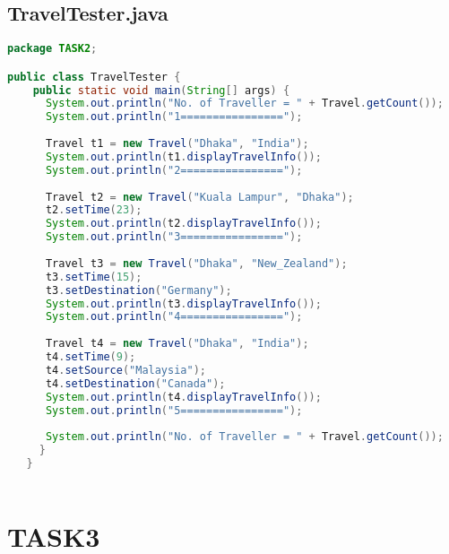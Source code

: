 \documentclass[11pt,a4paper]{article}
\begin{document}
\subsection*{TravelTester.java}
\begin{lstlisting}[style=codestyle,language=Java]
package TASK2;

public class TravelTester {
    public static void main(String[] args) {
      System.out.println("No. of Traveller = " + Travel.getCount());
      System.out.println("1================");
        
      Travel t1 = new Travel("Dhaka", "India");
      System.out.println(t1.displayTravelInfo());
      System.out.println("2================");
   
      Travel t2 = new Travel("Kuala Lampur", "Dhaka");
      t2.setTime(23);
      System.out.println(t2.displayTravelInfo());
      System.out.println("3================");
   
      Travel t3 = new Travel("Dhaka", "New_Zealand");
      t3.setTime(15);
      t3.setDestination("Germany");
      System.out.println(t3.displayTravelInfo());
      System.out.println("4================");
   
      Travel t4 = new Travel("Dhaka", "India");
      t4.setTime(9);
      t4.setSource("Malaysia");
      t4.setDestination("Canada");
      System.out.println(t4.displayTravelInfo());
      System.out.println("5================");
   
      System.out.println("No. of Traveller = " + Travel.getCount());
     }
   }
   
\end{lstlisting}

\clearpage
\section*{TASK3}
\end{document}

